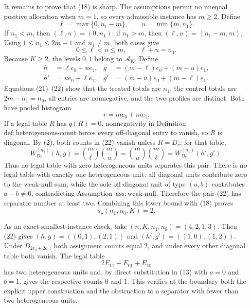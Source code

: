 It remains to prove that (18) is sharp.  The assumptions permit no unequal positive allocation when \(m=1\), so every admissible instance has \(m\geq2\).  Define
\[
 \ell=\max\{0,n_1-m\},
 \qquad
 u=\min\{m,n_1\}.
 \tag{20}
\]
If \(n_1<m\), then \((\ell,u)=(0,n_1)\); if \(n_1>m\), then \((\ell,u)=(n_1-m,m)\).  Using \(1\leq n_1\leq2m-1\) and \(n_1\neq m\), both cases give
\[
 0\leq\ell<u\leq m,
 \qquad \ell+u=n_1.
 \tag{21}
\]
Because \(K\geq2\), the levels \(0,1\) belong to \(\mathcal A_K\).  Define
\[
 \begin{aligned}
 h&=\ell e_0+u e_1,
 &g&=(m-\ell)e_0+(m-u)e_1,\\
 h'&=u e_0+\ell e_1,
 &g'&=(m-u)e_0+(m-\ell)e_1.
 \end{aligned}
 \tag{22}
\]
Equations (21)--(22) show that the treated totals are \(n_1\), the control totals are \(2m-n_1=n_0\), all entries are nonnegative, and the two profiles are distinct.  Both have pooled histogram
\[
 r=me_0+me_1.
 \tag{23}
\]
If a legal table \(R\) has \(q(R)=0\), nonnegativity in Definition~\(\mathrm{def:heterogeneous\mbox{-}count}\) forces every off-diagonal entry to vanish, so \(R\) is diagonal.  By (2), both counts in (22) vanish unless \(R=D_r\); for that table,
\[
 W_{D_r}^{(n_1)}(h,g)
 =\binom m\ell\binom mu
 =\binom mu\binom m\ell
 =W_{D_r}^{(n_1)}(h',g').
 \tag{24}
\]
Thus no legal table with zero heterogeneous units separates this pair.  There is no legal table with exactly one heterogeneous unit: all diagonal units contribute zero to the weak-null sum, while the sole off-diagonal unit of type \((a,b)\) contributes \(a-b\neq0\), contradicting Assumption~\(\mathrm{ass:weak\mbox{-}null}\).  Therefore the pair (22) has separator number at least two.  Combining this lower bound with (18) proves
\[
 s_\star(n_1,n_0,K)=2.
 \tag{25}
\]

As an exact smallest-instance check, take \((n,K,n_1,n_0)=(4,2,1,3)\).  Then (22) gives \((h,g)=((0,1),(2,1))\) and \((h',g')=((1,0),(1,2))\).  Under \(D_{2e_0+2e_1}\), both assignment counts equal \(2\), and under every other diagonal table both vanish.  The legal table
\[
 2E_{11}+E_{01}+E_{10}
\]
has two heterogeneous units and, by direct substitution in (13) with \(a=0\) and \(b=1\), gives the respective counts \(0\) and \(1\).  This verifies at the boundary both the explicit upper construction and the obstruction to a separator with fewer than two heterogeneous units.
